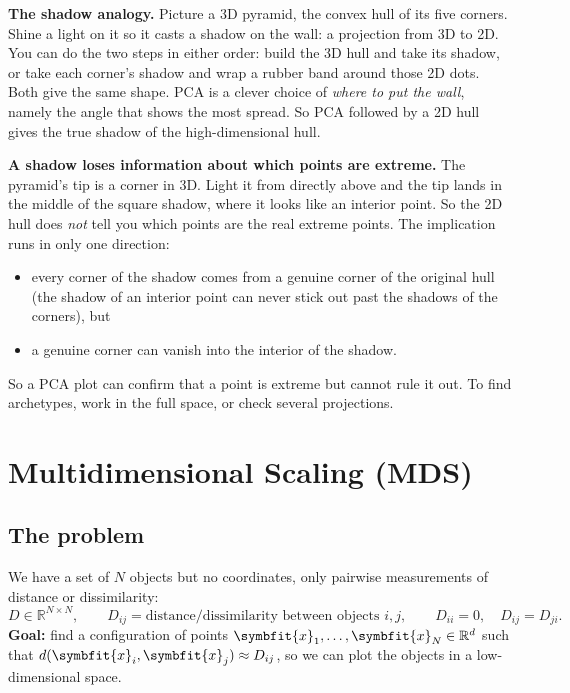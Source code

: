 \documentclass[11pt]{article}
\newcommand{\bm}[1]{\symbfit{#1}}
\newcommand{\R}{\mathbb{R}}
\newcommand{\vx}{\bm{x}}
\begin{document}
\begin{intuition}
\textbf{The shadow analogy.} Picture a 3D pyramid, the convex hull of its five corners. Shine a
light on it so it casts a shadow on the wall: a projection from 3D to 2D. You can do the two steps in
either order: build the 3D hull and take its shadow, or take each corner's shadow and wrap a
rubber band around those 2D dots. Both give the same shape. PCA is a clever choice of
\emph{where to put the wall}, namely the angle that shows the most spread. So PCA followed by a 2D
hull gives the true shadow of the high-dimensional hull.
\end{intuition}

\begin{careful}
\textbf{A shadow loses information about which points are extreme.} The pyramid's tip is a corner in
3D. Light it from directly above and the tip lands in the middle of the square shadow, where it looks
like an interior point. So the 2D hull does \emph{not} tell you which points are the real extreme
points. The implication runs in only one direction:
\begin{itemize}[nosep]
\item every corner of the shadow comes from a genuine corner of the original hull (the shadow of
an interior point can never stick out past the shadows of the corners), but
\item a genuine corner can vanish into the interior of the shadow.
\end{itemize}
So a PCA plot can confirm that a point is extreme but cannot rule it out. To find
archetypes, work in the full space, or check several projections.
\end{careful}

\section{Multidimensional Scaling (MDS)}

\subsection{The problem}

We have a set of $N$ objects but no coordinates, only pairwise measurements of
distance or dissimilarity:
\[
D\in\R^{N\times N},\qquad D_{ij}=\text{distance/dissimilarity between objects } i,j,\qquad D_{ii}=0,\quad D_{ij}=D_{ji}.
\]
\textbf{Goal:} find a configuration of points $\vx_1,\dots,\vx_N\in\R^d$ such that
$d(\vx_i,\vx_j)\approx D_{ij}$, so we can plot the objects in a low-dimensional space.
\end{document}
